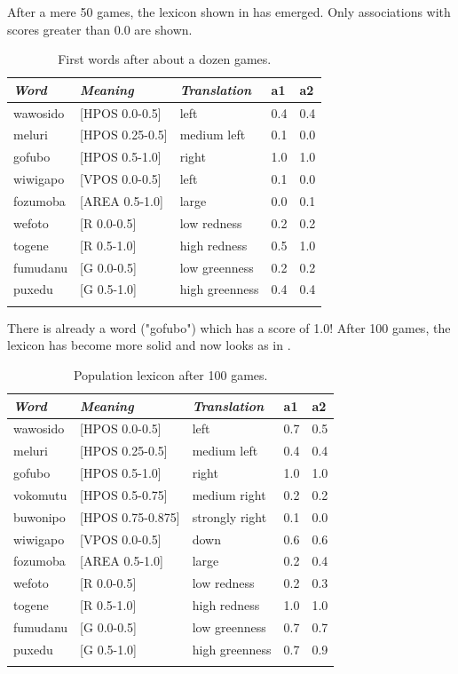 After a mere 50 games, the lexicon shown in  has emerged. Only
associations with scores greater than 0.0 are shown. 
\begin{table}
\begin{center}
\begin{tabular}{ l  l  l  l  l }
\lsptoprule
{\itshape Word}&{\itshape Meaning}&{\itshape Translation} & {\bfshape a1}&{\bfshape a2} \\ \midrule
wawosido & [HPOS 0.0-0.5] &left&0.4&0.4\\ 
meluri & [HPOS 0.25-0.5] &medium left&0.1&0.0\\ 
gofubo & [HPOS 0.5-1.0]& right&1.0&1.0\\ 
wiwigapo & [VPOS 0.0-0.5] &left&0.1&0.0\\ 
fozumoba & [AREA 0.5-1.0]&large & 0.0&0.1\\ 
wefoto & [R 0.0-0.5]& low redness &0.2&0.2\\ 
togene & [R 0.5-1.0]& high redness &0.5&1.0\\ 
fumudanu & [G 0.0-0.5]& low greenness &0.2&0.2\\ 
puxedu & [G 0.5-1.0]& high greenness &0.4&0.4\\ 
\lspbottomrule
\end{tabular}
\caption{\label{tab:game50} First words after about a dozen games.}
\end{center}
\end{table}
There is already a word ("gofubo") which has
a score of 1.0! After 100 games, the lexicon has become more 
solid and now looks as in . 
\begin{table}
\begin{center}
\begin{tabular}{ l  l  l  l  l }
\lsptoprule
{\itshape Word}&{\itshape Meaning}&{\itshape Translation} & {\bfshape a1}&{\bfshape a2} \\ \midrule
wawosido & [HPOS 0.0-0.5] &left&0.7&0.5\\ 
meluri & [HPOS 0.25-0.5] &medium left&0.4&0.4\\ 
gofubo & [HPOS 0.5-1.0]& right&1.0&1.0\\ 
vokomutu & [HPOS 0.5-0.75] &medium right&0.2&0.2\\ 
buwonipo & [HPOS 0.75-0.875] &strongly right&0.1&0.0\\ 
wiwigapo & [VPOS 0.0-0.5] &down&0.6&0.6\\ 
fozumoba & [AREA 0.5-1.0]&large & 0.2&0.4\\ 
wefoto & [R 0.0-0.5]& low redness &0.2&0.3\\ 
togene & [R 0.5-1.0]& high redness &1.0&1.0\\ 
fumudanu & [G 0.0-0.5]& low greenness &0.7&0.7\\ 
puxedu & [G 0.5-1.0]& high greenness &0.7&0.9\\ 
\lspbottomrule
\end{tabular}
\caption{\label{tab:goubo} Population lexicon after 100 games.}
\end{center}
\end{table}

